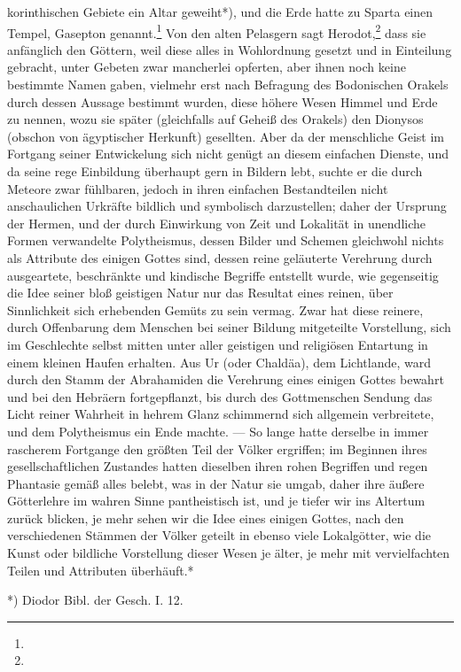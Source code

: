 \documentclass[a4paper, 11pt, oneside, polutonikogreek, german]{article}
\begin{document}
korinthischen Gebiete ein Altar geweiht*), und die Erde hatte zu Sparta einen Tempel, Gasepton genannt.\footnote{} Von den alten Pelasgern sagt Herodot,\footnote{} dass sie anfänglich den Göttern, weil diese alles in Wohlordnung gesetzt und in Einteilung gebracht, unter Gebeten zwar mancherlei opferten, aber ihnen noch keine bestimmte Namen gaben, vielmehr erst nach Befragung des Bodonischen Orakels durch dessen Aussage bestimmt wurden, diese höhere Wesen Himmel und Erde zu nennen, wozu sie später (gleichfalls auf Geheiß des Orakels) den Dionysos (obschon von ägyptischer Herkunft) gesellten. Aber da der menschliche Geist im Fortgang seiner Entwickelung sich nicht genügt an diesem einfachen Dienste, und da seine rege Einbildung überhaupt gern in Bildern lebt, suchte er die durch Meteore zwar fühlbaren, jedoch in ihren einfachen Bestandteilen nicht anschaulichen Urkräfte bildlich und symbolisch darzustellen; daher der Ursprung der Hermen, und der durch Einwirkung von Zeit und Lokalität in unendliche Formen verwandelte Polytheismus, dessen Bilder und Schemen gleichwohl nichts als Attribute des einigen Gottes sind, dessen reine geläuterte Verehrung durch ausgeartete, beschränkte und kindische Begriffe entstellt wurde, wie gegenseitig die Idee seiner bloß geistigen Natur nur das Resultat eines reinen, über Sinnlichkeit sich erhebenden Gemüts zu sein vermag. Zwar hat diese reinere, durch Offenbarung dem Menschen bei seiner Bildung mitgeteilte Vorstellung, sich im Geschlechte selbst mitten unter aller geistigen und religiösen Entartung in einem kleinen Haufen erhalten. Aus Ur (oder Chaldäa), dem Lichtlande, ward durch den Stamm der Abrahamiden die Verehrung eines einigen Gottes bewahrt und bei den Hebräern fortgepflanzt, bis durch des Gottmenschen Sendung das Licht reiner Wahrheit in hehrem Glanz schimmernd sich allgemein verbreitete, und dem Polytheismus ein Ende machte. --- So lange hatte derselbe in immer rascherem Fortgange den größten Teil der Völker ergriffen; im Beginnen ihres gesellschaftlichen Zustandes hatten dieselben ihren rohen Begriffen und regen Phantasie gemäß alles belebt, was in der Natur sie umgab, daher ihre äußere Götterlehre im wahren Sinne pantheistisch ist, und je tiefer wir ins Altertum zurück blicken, je mehr sehen wir die Idee eines einigen Gottes, nach den verschiedenen Stämmen der Völker geteilt in ebenso viele Lokalgötter, wie die Kunst oder bildliche Vorstellung dieser Wesen je älter, je mehr mit vervielfachten Teilen und Attributen überhäuft.*

*) Diodor Bibl. der Gesch. I. 12.
\end{document}
